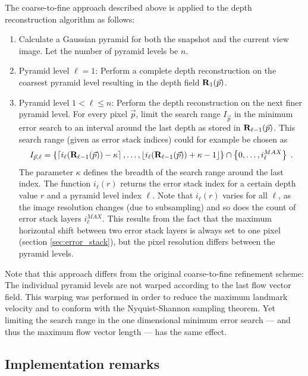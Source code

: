 The coarse-to-fine approach described above is applied to the depth reconstruction algorithm as follows:
\begin{enumerate}[1.]
 \item Calculate a Gaussian pyramid for both the snapshot and the current view image. Let the number of pyramid levels be $n$.
 \item Pyramid level $\ell = 1$: Perform a complete depth reconstruction on the coarsest pyramid level resulting in the depth field $\img{R}_1(\vec p)$.
 \item Pyramid level $1 < \ell \leq n$: Perform the depth reconstruction on the next finer pyramid level. For every pixel $\vec p$, limit the search range $I_{\vec p}$ in the minimum error search to an interval around the last depth as stored in $\img{R}_{\ell - 1}(\vec p)$. This search range (given as error stack indices) could for example be chosen as
 \begin{equation}
  I_{\vec p, \ell} = \left\{\left\lceil i_\ell(\img{R}_{\ell - 1}(\vec p)) - \kappa\right\rceil, \ldots, \left\lfloor i_\ell(\img{R}_{\ell - 1}(\vec p)) + \kappa - 1\right\rfloor\right\} \cap \left\{0, \ldots, i^{MAX}_\ell\right\}
  \label{eqn:index_range_general} \; .
 \end{equation}
 The parameter $\kappa$ defines the breadth of the search range around the last index. The function $i_\ell(r)$ returns the error stack index for a certain depth value $r$ and a pyramid level index $\ell$. Note that $i_\ell(r)$ varies for all $\ell$, as the image resolution changes (due to subsampling) and so does the count of error stack layers $i^{MAX}_\ell$. This results from the fact that the maximum horizontal shift between two error stack layers is always set to one pixel (section \ref{sec:error_stack}), but the pixel resolution differs between the pyramid levels.
\end{enumerate}
Note that this approach differs from the original coarse-to-fine refinement scheme: The individual pyramid levels are not warped according to the last flow vector field. This warping was performed in order to reduce the maximum landmark velocity and to conform with the Nyquist-Shannon sampling theorem. Yet limiting the search range in the one dimensional minimum error search --- and thus the maximum flow vector length --- has the same effect.

\subsection{Implementation remarks}

